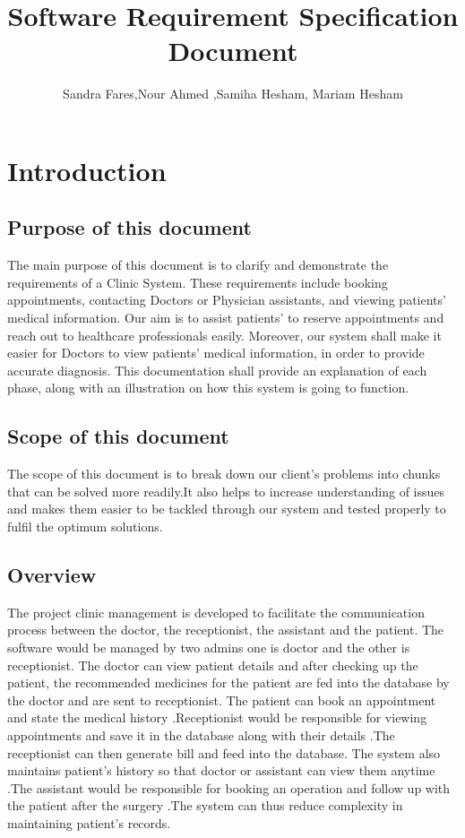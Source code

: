 \documentclass[]{article}
\title{Software Requirement Specification Document}
\author{Sandra Fares,Nour Ahmed ,Samiha Hesham, Mariam Hesham }
\begin{document}
\maketitle

\section{Introduction}

\subsection{Purpose of this document}
The main purpose of this document is to clarify and demonstrate the requirements of a Clinic System. These requirements include booking appointments, contacting Doctors or Physician assistants, and viewing patients' medical information. Our aim is to assist patients' to reserve appointments and reach out to healthcare professionals easily. Moreover, our system shall make it easier for Doctors to view patients' medical information, in order to provide accurate diagnosis. This documentation shall provide an explanation of each phase, along with an illustration on how this system is going to function. 

\subsection{ Scope of this document}
The scope of this document is to break down our client's problems into chunks that can be solved more readily.It also helps to increase understanding of issues and makes them easier to be tackled through our system and tested properly to fulfil the optimum solutions. 


\subsection{Overview}

The project clinic management is developed to facilitate the communication process between the doctor, the receptionist, the assistant and the patient. The software would be managed by two admins one is doctor and the other is receptionist. The doctor can view patient details and after checking up the patient, the recommended medicines for the patient are fed into the database by the doctor and are sent to receptionist. The patient can book an appointment and state the medical history .Receptionist would be responsible for viewing appointments and save it in the database along with their details .The receptionist can then generate bill and feed into the database. The system also maintains patient’s history so that doctor or assistant can view them anytime .The assistant would be responsible for booking an operation and follow up with the patient after the surgery .The system can thus reduce complexity in maintaining patient’s records.
\end{document}
